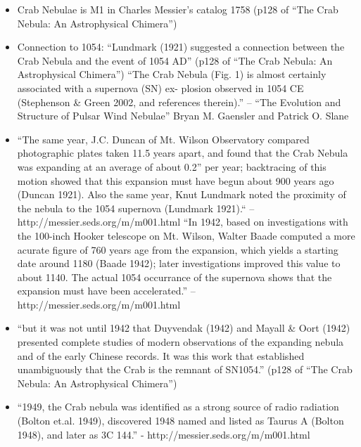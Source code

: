 \begin{itemize}
  \item Crab Nebulae is M1 in Charles Messier's catalog 1758 
    (p128 of ``The Crab Nebula: An Astrophysical Chimera'')
  \item Connection to 1054:
    ``Lundmark (1921) suggested a connection between the Crab Nebula and the event of 1054 AD''
    (p128 of ``The Crab Nebula: An Astrophysical Chimera'')
    ``The Crab Nebula (Fig. 1) is almost certainly associated with a
    supernova (SN) ex- plosion observed in 1054 CE (Stephenson \& Green
    2002, and references therein).'' -- ``The Evolution and Structure of Pulsar Wind Nebulae'' 
    Bryan M. Gaensler and Patrick O. Slane
  \item ``The same year, J.C. Duncan of Mt. Wilson Observatory compared
    photographic plates taken 11.5 years apart, and found that the
    Crab Nebula was expanding at an average of about 0.2'' per year;
    backtracing of this motion showed that this expansion must have
    begun about 900 years ago (Duncan 1921). Also the same year, Knut
    Lundmark noted the proximity of the nebula to the 1054 supernova
    (Lundmark 1921).`` -- http://messier.seds.org/m/m001.html
    ``In 1942, based on investigations with the 100-inch Hooker telescope
    on Mt. Wilson, Walter Baade computed a more acurate figure of 760
    years age from the expansion, which yields a starting date around
    1180 (Baade 1942); later investigations improved this value to about
    1140. The actual 1054 occurrance of the supernova shows that the
    expansion must have been accelerated.'' -- http://messier.seds.org/m/m001.html
  \item ``but it was not until 1942 that Duyvendak (1942) and Mayall \&
  Oort (1942) presented complete studies of modern observations of the
  expanding nebula and of the early Chinese records. It was this work
  that established unambiguously that the Crab is the remnant of SN1054.''
    (p128 of ``The Crab Nebula: An Astrophysical Chimera'')
  \item ``1949, the Crab nebula was identified as a strong source
  of radio radiation (Bolton et.al. 1949), discovered 1948 named
  and listed as Taurus A (Bolton 1948), and later as 3C 144.'' -
  http://messier.seds.org/m/m001.html





\end{itemize}
